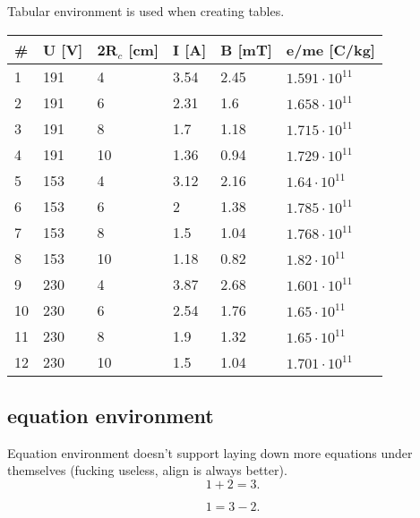 \documentclass[11pt,a4paper]{report}
\theoremstyle{remark}
\theoremstyle{definition}
\begin{document}
				\noindent
				Tabular environment is used when creating tables.
				\begin{center}
					\begin{tabular}{| m{0.5cm} | m{1.6cm} | m{1.6cm} | m{1.6cm} || m{1.6cm} | m{2.5cm} |}
						\hline
						\# & U [V] & 2R$_c$ [cm] & I [A] & B [mT] & e/me [C/kg] \\ [0.5ex]
						\hline\hline
						1 & 191 & 4 & 3.54 & 2.45 & $1.591 \cdot 10^{11}$ \\
						\hline
						2 & 191 & 6 & 2.31 & 1.6 & $1.658 \cdot 10^{11}$ \\
						\hline
						3 & 191 & 8 & 1.7 & 1.18 & $1.715 \cdot 10^{11}$ \\
						\hline
						4 & 191 & 10 & 1.36 & 0.94 & $1.729 \cdot 10^{11}$ \\
						\hline
						5 & 153 & 4 & 3.12 & 2.16 & $1.64 \cdot 10^{11}$ \\
						\hline
						6 & 153 & 6 & 2 & 1.38 & $1.785 \cdot 10^{11}$ \\
						\hline
						7 & 153 & 8 & 1.5 & 1.04 & $1.768 \cdot 10^{11}$ \\
						\hline
						8 & 153 & 10 & 1.18 & 0.82 & $1.82 \cdot 10^{11}$ \\
						\hline
						9 & 230 & 4 & 3.87 & 2.68 & $1.601 \cdot 10^{11}$ \\
						\hline
						10 & 230 & 6 & 2.54 & 1.76 & $1.65 \cdot 10^{11}$ \\
						\hline
						11 & 230 & 8 & 1.9 & 1.32 & $1.65 \cdot 10^{11}$ \\
						\hline
						12 & 230 & 10 & 1.5 & 1.04 & $1.701 \cdot 10^{11}$ \\
						\hline
					\end{tabular}
				\end{center}
		
			\subsection*{equation environment}
			
				\noindent
				Equation environment doesn't support laying down more equations under themselves (fucking useless, align is always better).
				\begin{equation}
					1 + 2 = 3.
				\end{equation}
				
				\begin{equation*}
					1 = 3 - 2.
				\end{equation*}
				
\end{document}
